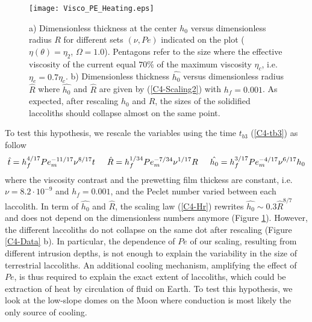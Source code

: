 \begin{figure}[h!]
  \begin{center}
    \graphicspath{ {/Users/thorey/Documents/These/Projet/Refroidissement/Skin_Model/Figure/Figure_Heating/} }
    \texttt{[image: Visco\_PE\_Heating.eps]}
    \caption{a)  Dimensionless thickness  at the  center $h_0$  versus
      dimensionless radius $R$ for different sets $(\nu,Pe)$ indicated
      on  the plot  ($\eta(\theta)=\eta_2$, $\Omega=1.0$).   Pentagons
      refer to the  size where the effective viscosity  of the current
      equal   $70\%$  of   the   maximum   viscosity  $\eta_c$,   i.e.
      $\eta_e=0.7\eta_c$.   b)   Dimensionless  thickness  $\hat{h_0}$
      versus  dimensionless  radius  $\hat{R}$ where  $\hat{h_0}$  and
      $\hat{R}$ are given by (\ref{C4-Scaling2}) with $h_f=0.001$.  As
      expected,  after  rescaling $h_0$  and  $R$,  the sizes  of  the
      solidified  laccoliths  should  collapse   almost  on  the  same
      point. }
    \label{C4-Visco_PE_Heating}
  \end{center}
\end{figure}


To  test this  hypothesis, we  rescale  the variables  using the  time
$t_{b3}$ (\ref{C4-tb3}) as follow
\begin{equation}
  \hat{t}=   h_f^{4/17}  Pe_m^{-11/17}\nu^{8/17}t      \hspace{.5cm}     \hat{R}=
  h_f^{1/34}Pe_m^{-7/34}\nu^{1/17}R\hspace{.5cm}                        \hat{h_0}=
  h_f^{3/17}Pe_m^{-4/17}\nu^{6/17}h_0
  \label{C4-Scaling2}
\end{equation}
where  the viscosity  contrast and  the prewetting  film thickess  are
constant,  i.e. $\nu  =  8.2\cdot 10^{-9}$  and  $h_f=0.001$, and  the
Peclet number varied  between each laccolith.  In  term of $\hat{h_0}$
and    $\hat{R}$,    the    scaling   law    (\ref{C4-Hr})    rewrites
$  \hat{h_0}  \sim  0.3\hat{R}^{8/7}$  and  does  not  depend  on  the
dimensionless            numbers            anymore            (Figure
\ref{C4-Visco_PE_Heating}). However,  the different laccoliths  do not
collapse on the same dot after rescaling (Figure \ref{C4-Data} b).  In
particular,  the dependence  of $Pe$  of our  scaling, resulting  from
different intrusion depths,  is not enough to  explain the variability
in  the  size  of   terrestrial  laccoliths.   An  additional  cooling
mechanism, amplifying the effect of  $Pe$, is thus required to explain
the exact extent  of laccoliths, which could be extraction  of heat by
circulation of fluid on Earth. To test this hypothesis, we look at the
low-slope domes on  the Moon where conduction is most  likely the only
source of cooling.

